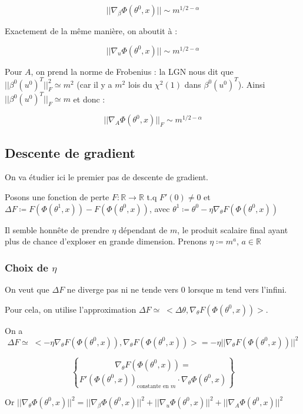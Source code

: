 \documentclass[a4paper, 11pt, french]{article}
\theoremstyle{definition}
\begin{document}
	 \[||\nabla_{\beta} \Phi (\theta^0, x)|| \sim m^{1/2 - \alpha}\]
	 
	 Exactement de la même manière, on aboutit à :
	 
	 \[||\nabla_u \Phi (\theta^0, x)|| \sim m^{1/2 - \alpha}\]
	 
	 Pour $A$, on prend la norme de Frobenius : la LGN nous dit que $||\beta^0 (u^0)^T||_F^2 \simeq m^2 $ (car il y a $m^2$ lois du $\chi^2(1)$ dans $\beta^0 (u^0)^T$). Ainsi $||\beta^0 (u^0)^T||_F \simeq m$ et donc :
	 
	 \[||\nabla_A \Phi (\theta^0, x)||_F \sim m^{1/2 - \alpha}\]
	 
	 \subsection{Descente de gradient}
	 
	 On va étudier ici le premier pas de descente de gradient.
	 
	 Posons une fonction de perte $F : \mathbb{R} \rightarrow \mathbb{R}$ t.q $F'(0) \neq 0$ et 
	 $\Delta F \coloneqq F(\Phi(\theta^1, x)) - F(\Phi(\theta^0, x))$, avec 
	 $\theta^1 \coloneqq \theta^0 - \eta \nabla_{\theta} F(\Phi(\theta^0, x))$
	 
	 Il semble honnête de prendre $\eta$ dépendant de $m$, le produit scalaire final ayant plus de chance d'exploser en grande dimension. Prenons $\eta \coloneqq m^a$, $a \in \mathbb{R}$ \\
	 
	 \subsubsection{Choix de $\eta$}
	 
	 On veut que $\Delta F$ ne diverge pas ni ne tende vers 0 lorsque m tend vers l'infini.
	 
	 Pour cela, on utilise l'approximation 
	 $\Delta F \simeq \; < \Delta \theta, \nabla_{\theta} F(\Phi(\theta^0, x)) >$.
	 
	 On a 
	 \[
	 \Delta F \simeq \; < -\eta \nabla_{\theta} F(\Phi(\theta^0, x)) , \nabla_{\theta} F(\Phi(\theta^0, x)) > = -\eta || \nabla_{\theta} F(\Phi(\theta^0, x)) ||^2
	 \]
	 
	 \[
	 \nabla_{\theta} F(\Phi(\theta^0, x)) = 
	 \brace{F'(\Phi(\theta^0, x))}_\text{constante en $m$} 
	 \cdot \nabla_{\theta} \Phi(\theta^0, x)
	 \]
	 
	 Or $ || \nabla_{\theta} \Phi(\theta^0, x) ||^2 = || \nabla_{\beta} \Phi(\theta^0, x) ||^2 + || \nabla_{u} \Phi(\theta^0, x) ||^2 + || \nabla_{A} \Phi(\theta^0, x) ||^2$ \\
	 
\end{document}
